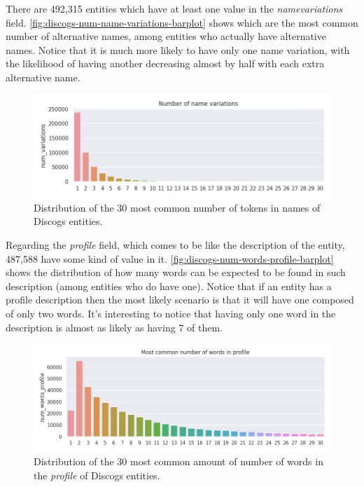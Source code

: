\documentclass[epsfig,a4paper,11pt,titlepage,twoside,openany]{book}
\begin{document}
There are 492,315 entities which have at least one value in the \textit{namevariations} field. \autoref{fig:discogs-num-name-variations-barplot} shows which are the most common number of alternative names, among entities who actually have alternative names. Notice that it is much more likely to have only one name variation, with the likelihood of having another decreasing almost by half with each extra alternative name.

\begin{figure}[]
  \centering \includegraphics[width=\textwidth]{discogs_num_name_variations} 
  \caption{Distribution of the 30 most common number of tokens in names of Discogs entities.}
  \label{fig:discogs-num-name-variations-barplot}
\end{figure}


Regarding the \textit{profile} field, which comes to be like the description of the entity, 487,588 have some kind of value in it. \autoref{fig:discogs-num-words-profile-barplot} shows the distribution of how many words can be expected to be found in such description (among entities who do have one). Notice that if an entity has a profile description then the most likely scenario is that it will have one composed of only two words. It's interesting to notice that having only one word in the description is almost as likely as having 7 of them. 

\begin{figure}[]
  \centering \includegraphics[width=\textwidth]{discogs_num_words_profile} 
  \caption{Distribution of the 30 most common amount of number of words in the \textit{profile} of Discogs entities.}
  \label{fig:discogs-num-words-profile-barplot}
\end{figure}
\end{document}
